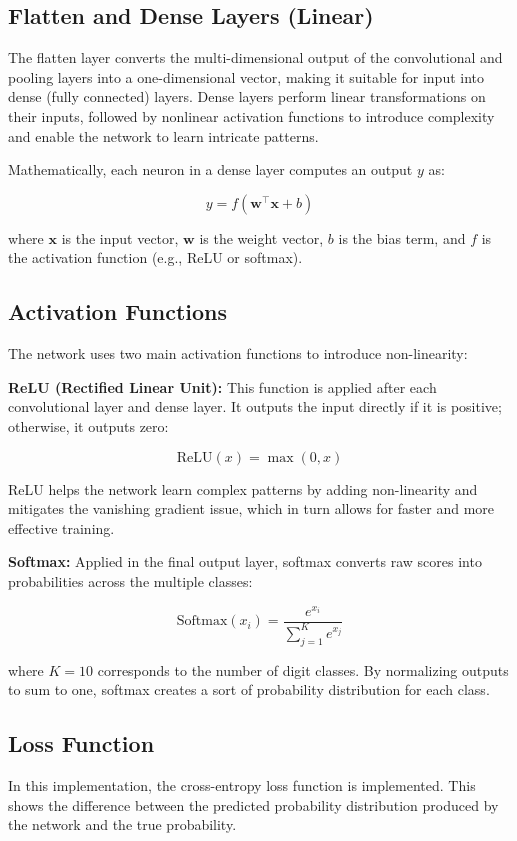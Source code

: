 \documentclass[conference]{IEEEtran}
\begin{document}
\subsection{Flatten and Dense Layers (Linear)}
The flatten layer converts the multi-dimensional output of the convolutional and pooling layers into a one-dimensional vector, making it suitable for input into dense (fully connected) layers. Dense layers perform linear transformations on their inputs, followed by nonlinear activation functions to introduce complexity and enable the network to learn intricate patterns.

Mathematically, each neuron in a dense layer computes an output \( y \) as:

\[
y = f(\mathbf{w}^\top \mathbf{x} + b)
\]

where \(\mathbf{x}\) is the input vector, \(\mathbf{w}\) is the weight vector, \(b\) is the bias term, and \(f\) is the activation function (e.g., ReLU or softmax).

\subsection{Activation Functions}
The network uses two main activation functions to introduce non-linearity:

\textbf{ReLU (Rectified Linear Unit):} This function is applied after each convolutional layer and dense layer. It outputs the input directly if it is positive; otherwise, it outputs zero:

\[
\text{ReLU}(x) = \max(0, x)
\]

ReLU helps the network learn complex patterns by adding non-linearity and mitigates the vanishing gradient issue, which in turn allows for faster and more effective training.

\textbf{Softmax:} Applied in the final output layer, softmax converts raw scores into probabilities across the multiple classes:

\[
\text{Softmax}(x_i) = \frac{e^{x_i}}{\sum_{j=1}^{K} e^{x_j}}
\]

where \(K=10\) corresponds to the number of digit classes. By normalizing outputs to sum to one, softmax creates a sort of probability distribution for each class.

\subsection{Loss Function}

In this implementation, the cross-entropy loss function is implemented. This shows the difference between the predicted probability distribution produced by the network and the true probability.
\end{document}
